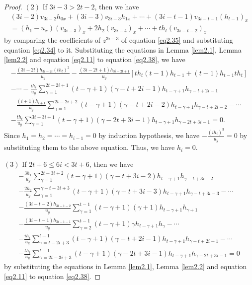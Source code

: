 \documentclass[12pt, twoside, leqno]{article}
\theoremstyle{definition}
\numberwithin{equation}{section}
\begin{document}
\begin{proof}
$(2)$ If $3i-3>2t-2$, then we have
\begin{equation}\label{eq2.38}
\begin{split}
(3i-2)v_{3i-2}h_{0x}+(3i-3)v_{3i-3}h_{1x}+\cdots+(3i-t-1)v_{3i-t-1}(h_{t-1})_x\\=(h_{1}-u_{x})(v_{3i-3})_x+2h_{2}(v_{3i-4})_x+\cdots+th_{t}(v_{3i-t-2})_x
\end{split}
\end{equation}
by comparing the coefficients of $z^{3i-3}$ of equation \eqref{eq2.35} and substituting equation \eqref{eq2.34} to it. Substituting the equations in Lemma \ref{lem2.1}, Lemma \ref{lem2.2} and equation  \eqref{eq2.11} to equation \eqref{eq2.38}, we have
\begin{equation}\nonumber
\begin{split}
-\frac{(3i-2t)h_{3i-2t}(th_{t})^{2}}{u_{y}}-\frac{(3i-2t+1)h_{3i-2t+1}}{u_{y}}[th_{t}(t-1)h_{t-1}+(t-1)h_{t-1}th_{t}]\\-\cdots-\frac{ih_{i}}{u_{y}}\sum_{\gamma=1}^{2t-2i+1}(t-\gamma+1)(\gamma-t+2i-1)h_{t-\gamma+1}h_{\gamma-t+2i-1}\\
-\frac{(i+1)h_{i+1}}{u_{y}}\sum_{\gamma=1}^{2t-2i+2}(t-\gamma+1)(\gamma-t+2i-2)h_{t-\gamma+1}h_{\gamma-t+2i-2}-\cdots\\-\frac{th_{t}}{u_{y}}\sum_{\gamma=1}^{3t-3i+1}(t-\gamma+1)(\gamma-2t+3i-1)h_{t-\gamma+1}h_{\gamma-2t+3i-1}=0.
\end{split}
\end{equation}
Since $h_1=h_2=\cdots=h_{i-1}=0$ by induction hypothesis, we have $-\frac{(ih_{i})^{3}}{u_{y}}=0$ by substituting them to the above equation. Thus, we have $h_i=0$.

$(3)$ If $2t+6\leq 6i< 3t+6$, then we have
\begin{equation}\label{eq2.39}
\begin{split}
-\frac{3h_{1}}{u_{y}}\sum_{\gamma=1}^{2t-3i+2}(t-\gamma+1)(\gamma-t+3i-2)h_{t-\gamma+1}h_{\gamma-t+3i-2}\\-\frac{2h_{2}}{u_{y}}\sum_{\gamma=1}^{\gamma-t-3i+3}(t-\gamma+1)(\gamma-t+3i-3)h_{t-\gamma+1}h_{\gamma-t+3i-3}-\cdots\\
	 -\frac{(3i-t-2)h_{3i-t-2}}{u_{y}}\sum_{\gamma=1}^{t-1}(t-\gamma+1)(\gamma+1)h_{t-\gamma+1}h_{\gamma+1}\\-\frac{(3i-t-1)h_{3i-t-1}}{u_{y}}\sum_{\gamma=2}^{t-1}(t-\gamma+1)\gamma h_{t-\gamma+1}h_{\gamma}-\cdots\\
	 -\frac{ih_{i}}{u_{y}}\sum_{\gamma=t-2i+3}^{t-1}(t-\gamma+1)(\gamma-t+2i-1)h_{t-\gamma+1}h_{\gamma-t+2i-1} -\cdots\\-\frac{th_{t}}{u_{y}}\sum_{\gamma=2t-3i+3}^{t-1}(t-\gamma+1)(\gamma-2t+3i-1)h_{t-\gamma+1}h_{\gamma-2t+3i-1}=0
\end{split}
\end{equation}
by substituting the equations in Lemma \ref{lem2.1}, Lemma \ref{lem2.2} and equation  \eqref{eq2.11} to equation \eqref{eq2.38}.


\end{proof}
\end{document}
